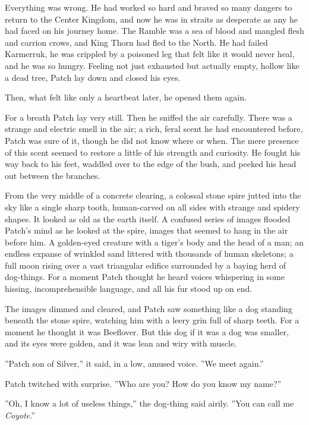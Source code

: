 \documentclass[12pt]{book}
\begin{document}
Everything was wrong. He had worked so hard and braved so many dangers to return to the Center Kingdom, and now he was in straits as desperate as any he had faced on his journey home. The Ramble was a sea of blood and mangled flesh and carrion crows, and King Thorn had fled to the North. He had failed Karmerruk, he was crippled by a poisoned leg that felt like it would never heal, and he was so hungry. Feeling not just exhausted but actually empty, hollow like a dead tree, Patch lay down and closed his eyes.

Then, what felt like only a heartbeat later, he opened them again.

For a breath Patch lay very still. Then he sniffed the air carefully. There was a strange and electric smell in the air; a rich, feral scent he had encountered before, Patch was sure of it, though he did not know where or when. The mere presence of this scent seemed to restore a little of his strength and curiosity. He fought his way back to his feet, waddled over to the edge of the bush, and peeked his head out between the branches.

From the very middle of a concrete clearing, a colossal stone spire jutted into the sky like a single sharp tooth, human-carved on all sides with strange and spidery shapes. It looked as old as the earth itself. A confused series of images flooded Patch's mind as he looked at the spire, images that seemed to hang in the air before him. A golden-eyed creature with a tiger's body and the head of a man; an endless expanse of wrinkled sand littered with thousands of human skeletons; a full moon rising over a vast triangular edifice surrounded by a baying herd of dog-things. For a moment Patch thought he heard voices whispering in some hissing, incomprehensible language, and all his fur stood up on end.

The images dimmed and cleared, and Patch saw something like a dog standing beneath the stone spire, watching him with a leery grin full of sharp teeth. For a moment he thought it was Beeflover. But this dog %
if it was a dog %
was smaller, and its eyes were golden, and it was lean and wiry with muscle.

''Patch son of Silver,'' it said, in a low, amused voice. ''We meet again.''

Patch twitched with surprise. ''Who are you? How do you know my name?''

''Oh, I know a lot of useless things,'' the dog-thing said airily. ''You can call me {\it Coyote}.''
\end{document}
